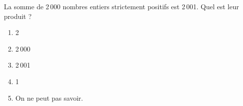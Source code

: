 La somme de 2\,000 nombres entiers strictement positifs est 2\,001. Quel est leur produit ?
\begin{multicols}{5}
  \begin{enumerate}[A/]
  \item 2
  \item 2\,000
  \item 2\,001
  \item 1
  \item On ne peut pas savoir.
  \end{enumerate}
\end{multicols}